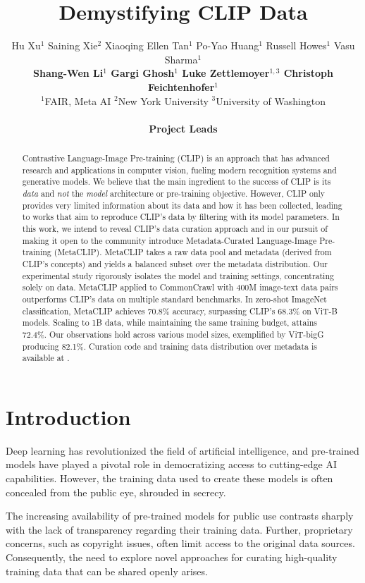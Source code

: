 \documentclass{article} %
\title{Demystifying CLIP Data}
\author{
\textcolor{borderpurple}{Hu Xu}$^{1}$ Saining Xie$^2$ Xiaoqing Ellen Tan$^1$ Po-Yao Huang$^1$ Russell Howes$^1$ Vasu Sharma$^1$ \\ \textbf{ \textcolor{borderpurple}{Shang-Wen Li}$^1$ \qquad Gargi Ghosh$^1$ \qquad Luke Zettlemoyer$^{1,3}$ \qquad Christoph Feichtenhofer$^1$}\\
$^1$FAIR, Meta AI \qquad $^2$New York University \qquad $^3$University of Washington\\
\\
\textbf{ \textcolor{borderpurple}{Project Leads}}
}
\begin{document}
\maketitle


\vspace{-5pt}


\begin{abstract}
Contrastive Language-Image Pre-training (CLIP) is an approach that has advanced research and applications in computer vision, fueling modern recognition systems and generative models. We believe that the main ingredient to the success of CLIP is its \textit{data} and \textit{not} the \textit{model} architecture or pre-training {objective}. However, CLIP only provides very limited information about its data and how it has been collected, leading to works that aim to reproduce CLIP's data by filtering with its model parameters. 
In this work, we intend to reveal CLIP's data curation approach 
and in our pursuit of making it open to the community introduce Metadata-Curated Language-Image Pre-training (MetaCLIP). 
MetaCLIP takes a raw data pool and metadata (derived from CLIP's concepts) and yields a balanced subset over the metadata distribution. 
Our experimental study rigorously isolates the model and training settings, concentrating solely on data.
MetaCLIP applied to CommonCrawl with 400M image-text data pairs outperforms CLIP's data on multiple standard benchmarks. 
In zero-shot ImageNet classification, MetaCLIP achieves 70.8\% accuracy, surpassing CLIP's 68.3\% on \mbox{ViT-B} models. Scaling to 1B data, while maintaining the same training budget, attains {72.4\%}. Our observations hold across various model sizes, exemplified by  ViT-bigG producing {82.1\%}. 
Curation code and training data distribution over metadata is available at {}.
\end{abstract}

\vspace{-5pt}
\section{Introduction}
\label{sec:intro}
Deep learning has revolutionized the field of artificial intelligence, and pre-trained models have played a pivotal role in democratizing access to cutting-edge AI capabilities. However, the training data used to create these models is often concealed from the public eye, shrouded in secrecy.

The increasing availability of pre-trained models for public use contrasts sharply with the lack of transparency regarding their training data. Further, proprietary concerns, such as copyright issues, often limit access to the original data sources. Consequently, the need to explore novel approaches for curating high-quality training data that can be shared openly arises.
\end{document}
